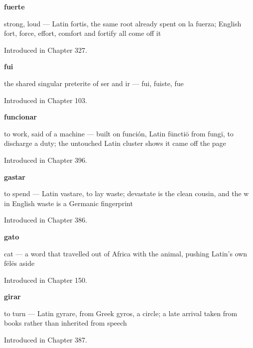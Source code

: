 \noindent\begin{minipage}[t]{\linewidth}
\raggedright
\textbf{fuerte}\par
\small strong, loud — Latin fortis, the same root already spent on la fuerza; English fort, force, effort, comfort and fortify all come off it\par
\footnotesize Introduced in Chapter 327.
\end{minipage}\par\medskip

\noindent\begin{minipage}[t]{\linewidth}
\raggedright
\textbf{fui}\par
\small the shared singular preterite of ser and ir — fui, fuiste, fue\par
\footnotesize Introduced in Chapter 103.
\end{minipage}\par\medskip

\noindent\begin{minipage}[t]{\linewidth}
\raggedright
\textbf{funcionar}\par
\small to work, said of a machine — built on función, Latin fūnctiō from fungī, to discharge a duty; the untouched Latin cluster shows it came off the page\par
\footnotesize Introduced in Chapter 396.
\end{minipage}\par\medskip

\noindent\begin{minipage}[t]{\linewidth}
\raggedright
\textbf{gastar}\par
\small to spend — Latin vastare, to lay waste; devastate is the clean cousin, and the w in English waste is a Germanic fingerprint\par
\footnotesize Introduced in Chapter 386.
\end{minipage}\par\medskip

\noindent\begin{minipage}[t]{\linewidth}
\raggedright
\textbf{gato}\par
\small cat — a word that travelled out of Africa with the animal, pushing Latin's own fēlēs aside\par
\footnotesize Introduced in Chapter 150.
\end{minipage}\par\medskip

\noindent\begin{minipage}[t]{\linewidth}
\raggedright
\textbf{girar}\par
\small to turn — Latin gyrare, from Greek gyros, a circle; a late arrival taken from books rather than inherited from speech\par
\footnotesize Introduced in Chapter 387.
\end{minipage}\par\medskip

